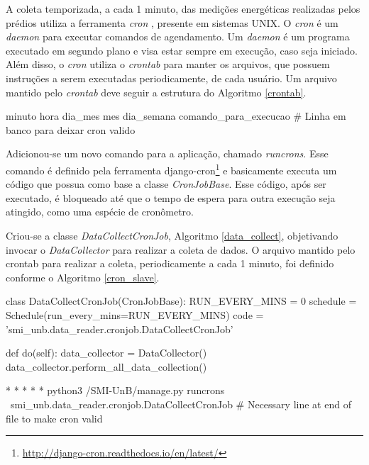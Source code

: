 A coleta temporizada, a cada 1 minuto, das medições energéticas realizadas pelos prédios utiliza a ferramenta \textit{cron} \cite{paul_cron}, presente em sistemas UNIX. O \textit{cron} é um \textit{daemon} para executar comandos de agendamento. Um \textit{daemon} é um programa executado em segundo plano e visa estar sempre em execução, caso seja iniciado. Além disso, o \textit{cron} utiliza o \textit{crontab} para manter os arquivos, que possuem instruções a serem executadas periodicamente, de cada usuário. Um arquivo mantido pelo \textit{crontab} deve seguir a estrutura do Algoritmo \ref{crontab}.

\begin{python}[caption={Estrutura de um arquivo mantido pelo \textit{crontab}.}, captionpos=b, label={crontab}]
minuto hora dia_mes mes dia_semana comando_para_execucao
# Linha em banco para deixar cron valido
\end{python}

Adicionou-se um novo comando para a aplicação, chamado \textit{runcrons}. Esse comando é definido pela ferramenta django-cron\footnote{\url{http://django-cron.readthedocs.io/en/latest/}} e basicamente executa um código que possua como base a classe \textit{CronJobBase}. Esse código, após ser executado, é bloqueado até que o tempo de espera para outra execução seja atingido, como uma espécie de cronômetro.

Criou-se a classe \textit{DataCollectCronJob}, Algoritmo \ref{data_collect}, objetivando invocar o \textit{DataCollector} para realizar a coleta de dados. O arquivo mantido pelo crontab para realizar a coleta, periodicamente a cada 1 minuto, foi definido conforme o Algoritmo \ref{cron_slave}.

\begin{python}[caption={Classe \textit{DataCollectCronJob}.}, captionpos=b, label={data_collect}]
class DataCollectCronJob(CronJobBase):
    RUN_EVERY_MINS = 0
    schedule = Schedule(run_every_mins=RUN_EVERY_MINS)
    code = 'smi_unb.data_reader.cronjob.DataCollectCronJob'

    def do(self):
        data_collector = DataCollector()
        data_collector.perform_all_data_collection()
\end{python}

\begin{python}[caption={\textit{Cron} para execução da coleta dos dados de energia.}, captionpos=b, label={cron_slave}]
* * * * * python3 /SMI-UnB/manage.py runcrons \
smi_unb.data_reader.cronjob.DataCollectCronJob
# Necessary line at end of file to make cron valid
\end{python}

